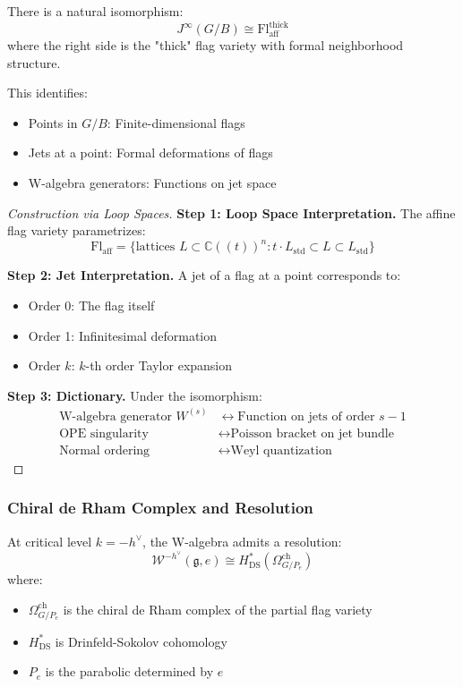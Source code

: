 \begin{theorem}\label{thm:jet-flag}
There is a natural isomorphism:
\[
J^{\infty}(G/B) \cong \mathrm{Fl}_{\mathrm{aff}}^{\mathrm{thick}}
\]
where the right side is the "thick" flag variety with formal neighborhood structure.

This identifies:
\begin{itemize}
\item Points in $G/B$: Finite-dimensional flags
\item Jets at a point: Formal deformations of flags
\item W-algebra generators: Functions on jet space
\end{itemize}
\end{theorem}

\begin{proof}[Construction via Loop Spaces]
\textbf{Step 1: Loop Space Interpretation.} The affine flag variety parametrizes:
\[
\mathrm{Fl}_{\mathrm{aff}} = \{\text{lattices } L \subset \mathbb{C}((t))^n : t \cdot L_{\mathrm{std}} \subset L \subset L_{\mathrm{std}}\}
\]

\textbf{Step 2: Jet Interpretation.} A jet of a flag at a point corresponds to:
\begin{itemize}
\item Order 0: The flag itself
\item Order 1: Infinitesimal deformation
\item Order $k$: $k$-th order Taylor expansion
\end{itemize}

\textbf{Step 3: Dictionary.} Under the isomorphism:
\begin{align}
\text{W-algebra generator } W^{(s)} &\leftrightarrow \text{Function on jets of order } s-1 \\
\text{OPE singularity} &\leftrightarrow \text{Poisson bracket on jet bundle} \\
\text{Normal ordering} &\leftrightarrow \text{Weyl quantization}
\end{align}
\end{proof}

\subsubsection{Chiral de Rham Complex and Resolution}

\begin{theorem}\label{thm:w-cdr}
At critical level $k = -h^\vee$, the W-algebra admits a resolution:
\[
\mathcal{W}^{-h^\vee}(\mathfrak{g}, e) \cong H^*_{\mathrm{DS}}(\Omega^{\mathrm{ch}}_{G/P_e})
\]
where:
\begin{itemize}
\item $\Omega^{\mathrm{ch}}_{G/P_e}$ is the chiral de Rham complex of the partial flag variety
\item $H^*_{\mathrm{DS}}$ is Drinfeld-Sokolov cohomology
\item $P_e$ is the parabolic determined by $e$
\end{itemize}
\end{theorem}

